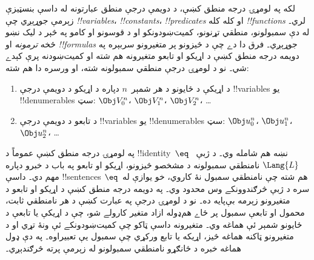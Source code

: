\documentclass[../../../include/open-logic-section]{subfiles}
\begin{document}


لکه په لومړۍ درجه منطق کښې، د دويمې درجې منطق عبارتونه له داسې بنسټيزې زېرمې جوړېږي چې \emph{!!{variable}s}، \emph{!!{constant}s}، \emph{!!{predicate}s} او کله کله \emph{!!{function}s} لري۔ له دې سمبولونو، منطقي تړنونو، کميت‌ښودونکو او د قوسونو او کامو په څېر د ليک نښو څخه \emph{ترمونه} او \emph{!!{formula}s} جوړېږي۔ فرق دا دے چې د څيزونو پر متغيرونو سربېره په دويمه درجه منطق کښې د اړيکو او تابعو متغيرونه هم شته او کميت‌ښودنه پرې کېدے شي۔ نو د لومړۍ درجې منطقي سمبولونه شته، او ورسره دا هم شته:

\begin{enumerate}
\item د اړيکې د ځايونو د هر شمېر~$n$ دپاره د اړيکو د دويمې درجې !!{variable}s يو !!{denumerable}s سټ: $\Obj V_0^n$، $\Obj V_1^n$، $\Obj V_2^n$، \dots
\item د تابعو د دويمې درجې !!{variable}s يو !!{denumerable}s سټ: $\Obj u_0^n$، $\Obj u_1^n$، $\Obj u_2^n$، \dots
\end{enumerate}

په لومړۍ درجه منطق کښې عموماً د !!{identity}~$\eq$ نښه هم شامله وي۔ د ژبې~$\Lang{L}$ نامنطقي سمبولونه د مشخصو څيزونو، اړيکو او تابعو په باب د خبرو دپاره مهم دي۔ داسې !!{sentences} هم شته چې نامنطقي سمبول نۀ کاروي، خو يوازې له~$\eq$ سره د ژبې څرګندوونکے وس محدود وي۔ په دويمه درجه منطق کښې د اړيکو او تابعو د متغيرونو زېرمه بې‌پايه ده۔ نو د لومړۍ درجې په عبارت کښې د هر نامنطقي ثابت، محمول او تابعې سمبول پر ځاے هم‌ډوله ازاد متغير کارولے شو، چې د اړيکې يا تابعې د ځايونو شمېر ئې هماغه وي۔ متغيرونه داسې ټاکو چې کميت‌ښودونکے ئې ونۀ تړي او د متغيرونو ټاکنه هماغه څيز، اړيکه يا تابع ورکړي چې سمبول يې تعبيراوه۔ په دې ډول هماغه خبره د ځانګړو نامنطقي سمبولونو له زېرمې پرته څرګندېږي۔
\end{document}
